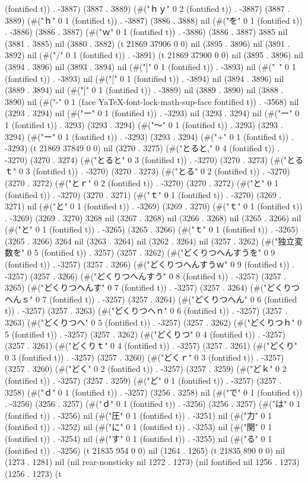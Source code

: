 (fontified t)) . -3887) (3887 . 3889) (#("ｈｙ" 0 2 (fontified t)) . -3887) (3887 . 3889) (#("ｈ" 0 1 (fontified t)) . -3887) (3886 . 3888) nil (#("を" 0 1 (fontified t)) . -3886) (3886 . 3887) (#("ｗ" 0 1 (fontified t)) . -3886) (3886 . 3887) 3885 nil (3881 . 3885) nil (3880 . 3882) (t 21869 37906 0 0) nil (3895 . 3896) nil (3891 . 3892) nil (#("/" 0 1 (fontified t)) . -3891) (t 21869 37900 0 0) nil (3895 . 3896) nil (3894 . 3896) nil (3893 . 3894) nil (#("]" 0 1 (fontified t)) . -3893) nil (#("~" 0 1 (fontified t)) . -3893) nil (#("[" 0 1 (fontified t)) . -3894) nil (3894 . 3896) nil (3889 . 3894) nil (#("]" 0 1 (fontified t)) . -3889) nil (3889 . 3890) nil (3888 . 3890) nil (#("-" 0 1 (face YaTeX-font-lock-math-sup-face fontified t)) . -3568) nil (3293 . 3294) nil (#("ー" 0 1 (fontified t)) . -3293) nil (3293 . 3294) nil (#("ー" 0 1 (fontified t)) . 3293) (3293 . 3294) (#("〜" 0 1 (fontified t)) . 3293) (3293 . 3294) (#("ー" 0 1 (fontified t)) . -3293) (3293 . 3294) (#("+" 0 1 (fontified t)) . -3293) (t 21869 37849 0 0) nil (3270 . 3275) (#("とると," 0 4 (fontified t)) . -3270) (3270 . 3274) (#("とると" 0 3 (fontified t)) . -3270) (3270 . 3273) (#("とるｔ" 0 3 (fontified t)) . -3270) (3270 . 3273) (#("とる" 0 2 (fontified t)) . -3270) (3270 . 3272) (#("とｒ" 0 2 (fontified t)) . -3270) (3270 . 3272) (#("と" 0 1 (fontified t)) . -3270) (3270 . 3271) (#("ｔ" 0 1 (fontified t)) . -3270) (3269 . 3271) nil (#("と" 0 1 (fontified t)) . -3269) (3269 . 3270) (#("ｔ" 0 1 (fontified t)) . -3269) (3269 . 3270) 3268 nil (3267 . 3268) nil (3266 . 3268) nil (3265 . 3266) nil (#("と" 0 1 (fontified t)) . -3265) (3265 . 3266) (#("ｔ" 0 1 (fontified t)) . -3265) (3265 . 3266) 3264 nil (3263 . 3264) nil (3262 . 3264) nil (3257 . 3262) (#("独立変数を" 0 5 (fontified t)) . 3257) (3257 . 3262) (#("どくりつへんすうを" 0 9 (fontified t)) . -3257) (3257 . 3266) (#("どくりつへんすうｗ" 0 9 (fontified t)) . -3257) (3257 . 3266) (#("どくりつへんすう" 0 8 (fontified t)) . -3257) (3257 . 3265) (#("どくりつへんす" 0 7 (fontified t)) . -3257) (3257 . 3264) (#("どくりつへんｓ" 0 7 (fontified t)) . -3257) (3257 . 3264) (#("どくりつへん" 0 6 (fontified t)) . -3257) (3257 . 3263) (#("どくりつへｎ" 0 6 (fontified t)) . -3257) (3257 . 3263) (#("どくりつへ" 0 5 (fontified t)) . -3257) (3257 . 3262) (#("どくりつｈ" 0 5 (fontified t)) . -3257) (3257 . 3262) (#("どくりつ" 0 4 (fontified t)) . -3257) (3257 . 3261) (#("どくりｔ" 0 4 (fontified t)) . -3257) (3257 . 3261) (#("どくり" 0 3 (fontified t)) . -3257) (3257 . 3260) (#("どくｒ" 0 3 (fontified t)) . -3257) (3257 . 3260) (#("どく" 0 2 (fontified t)) . -3257) (3257 . 3259) (#("どｋ" 0 2 (fontified t)) . -3257) (3257 . 3259) (#("ど" 0 1 (fontified t)) . -3257) (3257 . 3258) (#("ｄ" 0 1 (fontified t)) . -3257) (3256 . 3258) nil (#("で" 0 1 (fontified t)) . -3256) (3256 . 3257) (#("ｄ" 0 1 (fontified t)) . -3256) (3256 . 3257) (#("は" 0 1 (fontified t)) . -3256) nil (#("圧" 0 1 (fontified t)) . -3251) nil (#("力" 0 1 (fontified t)) . -3252) nil (#("に" 0 1 (fontified t)) . -3253) nil (#("関" 0 1 (fontified t)) . -3254) nil (#("す" 0 1 (fontified t)) . -3255) nil (#("る" 0 1 (fontified t)) . -3256) (t 21835 954 0 0) nil (1264 . 1265) (t 21835 890 0 0) nil (1273 . 1281) nil (nil rear-nonsticky nil 1272 . 1273) (nil fontified nil 1256 . 1273) (1256 . 1273) (t 